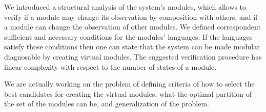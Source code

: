 \documentclass[letterpaper, 10pt, conference]{ieeeconf}
\begin{document}
We introduced a structural analysis of the system's modules, which allows
to verify if a module may change its observation by composition with others,
and if a module can change the observation of other modules. We defined
correspondent sufficient and necessary conditions for the modules' languages. If
the languages satisfy those conditions then one can state that the system can
be made modular diagnosable by creating virtual modules.
The suggested verification procedure has linear complexity with respect to the
number of states of a module.

We are actually working on the problem of defining criteria of how to select the
best candidates for creating the virtual modules, what the optimal partition of
the set of the modules can be, and generalization of the problem.






\end{document}
